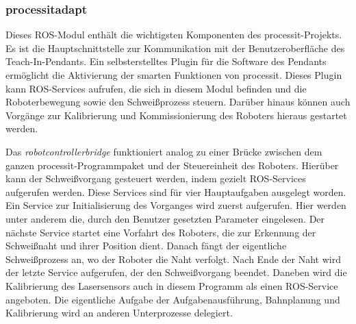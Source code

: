 \subsubsection{processit\textunderscore adapt}
Dieses ROS-Modul enthält die wichtigsten Komponenten des processit-Projekts. Es ist die Hauptschnittstelle zur Kommunikation mit der Benutzeroberfläche des Teach-In-Pendants. Ein selbsterstelltes Plugin für die Software des Pendants ermöglicht die Aktivierung der smarten Funktionen von processit. Dieses Plugin kann ROS-Services aufrufen, die sich in diesem Modul befinden und die Roboterbewegung sowie den Schweißprozess steuern. Darüber hinaus können auch Vorgänge zur Kalibrierung und Kommissionierung des Roboters hieraus gestartet werden.

Das \emph{robot\textunderscore controller\textunderscore bridge} funktioniert analog zu einer Brücke zwischen dem ganzen processit-Programmpaket und der Steuereinheit des Roboters. Hierüber kann der Schweißvorgang gesteuert werden, indem gezielt ROS-Services aufgerufen werden. Diese Services sind für vier Hauptaufgaben ausgelegt worden. Ein Service zur Initialisierung des Vorganges wird zuerst aufgerufen. Hier werden unter anderem die, durch den Benutzer gesetzten Parameter eingelesen. Der nächste Service startet eine Vorfahrt des Roboters, die zur Erkennung der Schweißnaht und ihrer Position dient. Danach fängt der eigentliche Schweißprozess an, wo der Roboter die Naht verfolgt. Nach Ende der Naht wird der letzte Service aufgerufen, der den Schweißvorgang beendet. Daneben wird die Kalibrierung des Lasersensors auch in diesem Programm als einen ROS-Service angeboten. Die eigentliche Aufgabe der Aufgabenausführung, Bahnplanung und Kalibrierung wird an anderen Unterprozesse delegiert. 

